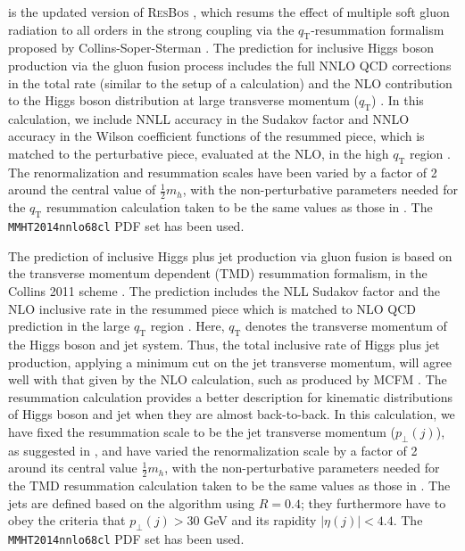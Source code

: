 \subsubsection{\hjetscompResbos}
\label{sec:hjetscomp:tools:ares:resbos}

\hjetscompResbos is the updated version of \textsc{ResBos} \cite{Balazs:1997xd}, 
which resums the effect of multiple soft gluon radiation to all orders 
in the strong coupling via the $q_\text{T}$-resummation formalism proposed by 
Collins-Soper-Sterman \cite{Collins:1984kg}. The \hjetscompResbos prediction 
for inclusive Higgs boson production via the gluon fusion process 
includes the full NNLO QCD corrections in the total rate (similar to 
the setup of a \hjetscompHNNLO calculation) and 
the NLO contribution to the Higgs boson distribution at large transverse 
momentum ($q_\text{T}$) \cite{Glosser:2002gm}. In this calculation, we include 
NNLL accuracy in the Sudakov factor and NNLO accuracy in the Wilson coefficient functions 
of the resummed piece, which is matched to the perturbative piece, 
evaluated at the NLO, in the high $q_\text{T}$ region \cite{Wang:2012xs}. The 
renormalization and resummation scales have been varied by a factor 
of 2 around the central value of $\tfrac{1}{2}m_h$, with the 
non-perturbative parameters needed for the $q_\text{T}$ resummation calculation 
taken to be the same values as those in \cite{Wang:2012xs}. The 
\texttt{MMHT2014nnlo68cl} PDF set has been used.

The \hjetscompResbos prediction of inclusive Higgs plus jet production via 
gluon fusion is based on the transverse momentum dependent (TMD) 
resummation formalism, in the Collins 2011 scheme \cite{Collins:2011zzd}.
The prediction includes the NLL Sudakov factor and the NLO inclusive rate in the 
resummed piece which is matched to NLO QCD prediction in the large 
$q_\text{T}$ region \cite{Sun:2016kkh}. Here, $q_\text{T}$ denotes the transverse 
momentum of the Higgs boson and jet system. Thus, the total 
inclusive rate of Higgs plus jet production, applying a minimum cut on the jet transverse 
momentum, will agree well with that given by the NLO calculation, such 
as produced by \textsc{MCFM} \cite{Campbell:2010ff}. 
The resummation calculation provides a better description for kinematic distributions 
of Higgs boson and jet when they are almost back-to-back. In this 
calculation, we have fixed the resummation scale to be the jet 
transverse momentum ($p_\perp(j)$), as suggested in \cite{Sun:2016kkh}, 
and have varied the renormalization scale by a factor of 2 around its 
central value $\tfrac{1}{2}m_h$, with the non-perturbative parameters 
needed for the TMD resummation calculation taken to be the same values 
as those in \cite{Sun:2016kkh}. The jets are defined based on the \hjetscompantikt 
algorithm using $R = 0.4$; they furthermore have to obey the criteria that 
$p_\perp(j) > 30$ GeV and its rapidity $|\eta(j)| < 4.4$. The 
\texttt{MMHT2014nnlo68cl} PDF set has been used.

